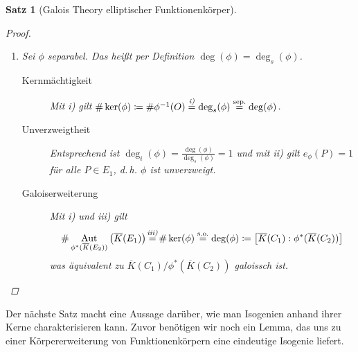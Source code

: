 \documentclass[english, german, parskip=half]{scrartcl}
\newtheorem{Satz}{Satz}[section]
\theoremstyle{definition}
\theoremstyle{remark}
\newcommand*{\algK}{\ensuremath{\overline K}} %
\newcommand*{\degs}{\operatorname{\deg}_s} %
\newcommand*{\degi}{\operatorname{\deg}_i} %
\DeclareMathOperator{\Aut}{Aut}
\begin{document}
\begin{Satz}[Galois Theory elliptischer Funktionenkörper]
\begin{proof}
\begin{enumerate}[label=\roman*)]
\begin{description}
          die stark von den Koordinaten von $T$ und $O$ abhängen,
          geht hervor, dass dann bereits die Koordinaten von
          $T$ und $O$ übereinstimmen müssen. Damit muss $T=O$ sein.
        \end{description}
    \item Sei $\phi$ separabel. Das heißt per Definition
      $\deg(\phi)=\degs(\phi)$.
      \begin{description}
        \item[Kernmächtigkeit]
          Mit \emph{i)} gilt
          $
          \#\ker(\phi)
          \coloneqq \#\phi^{-1}(O)
          \overset{\mathclap{\emph{i)}}}{=} \degs(\phi)
          \overset{{\text{sep.}}}{=} \deg(\phi)
          $.
        \item[Unverzweigtheit] 
          Entsprechend ist
          $\degi(\phi)=\frac{\deg(\phi)}{\degs(\phi)}=1$
          und mit \emph{ii)} gilt
          $e_\phi(P)=1$ für alle $P\in E_1$, d.\,h. $\phi$
          ist unverzweigt.
        \item[Galoiserweiterung]
          Mit \emph{i)} und \emph{iii)} gilt
          \begin{align*}
            \#\Aut_{\phi^*(\algK(E_2))}\left( \algK(E_1) \right) 
            \overset{\mathclap{\text{\emph{iii)}}}}{=}
              \#\ker(\phi)
            \overset{{\text{s.o.}}}{=} \deg(\phi)
            \coloneqq \left[\algK(C_1):\phi^*(\algK(C_2))\right]
          \end{align*}
          was äquivalent zu
          $\algK(C_1)/\phi^*(\algK(C_2))$ galoissch ist.
        \end{description}
      \end{enumerate}
\end{proof}
\end{Satz}

Der nächste Satz macht eine Aussage darüber, wie man Isogenien anhand
ihrer Kerne charakterisieren kann.
Zuvor benötigen wir noch ein Lemma, das uns zu einer Körpererweiterung
von Funktionenkörpern eine eindeutige Isogenie liefert.
\end{document}
